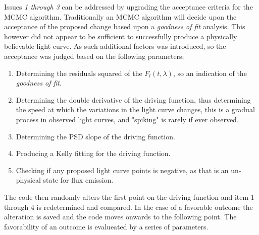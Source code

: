 \documentclass[a4paper, 12pt, twoside]{article}
\begin{document}
Issues \emph{1 through 3} can be addressed by upgrading the acceptance criteria for the MCMC algorithm. Traditionally an MCMC algorithm will decide upon the acceptance of the proposed change based upon a \emph{goodness of fit} analysis. This however did not appear to be sufficient to successfully produce a physically believable light curve. As such additional factors was introduced, so the acceptance was judged based on the following parameters;
\begin{enumerate}
\item Determining the residuals squared of the $F_l(t,\lambda)$, so an indication of the \emph{goodness of fit}.
\item Determining the double derivative of the driving function, thus determining the speed at which the variations in the light curve changes, this is a gradual process in observed light curves, and "spiking" is rarely if ever observed.
\item Determining the PSD slope of the driving function.
\item Producing a Kelly fitting for the driving function.
\item Checking if any proposed light curve points is negative, as that is an un-physical state for flux emission. 
\end{enumerate}
The code then randomly alters the first point on the driving function and item 1 through 4 is redetermined and compared. In the case of a favorable outcome the alteration is saved and the code moves onwards to the following point. The favorability of an outcome is evalueated by a series of parameters. 
\end{document}
